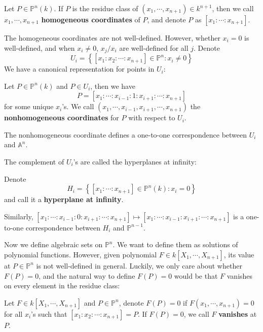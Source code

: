 \documentclass{note-eng}
\begin{document}
\begin{definition}
    Let $P \in \mathbb{P}^n(k)$. If $P$ is the residue class of $(x_1, \cdots, x_{n + 1}) \in k^{n + 1}$, then we call $x_1, \cdots, x_{n + 1}$ \textbf{homogeneous coordinates} of $P$, and denote $P$ as $[x_1 : \cdots : x_{n + 1}]$.
\end{definition}

The homogeneous coordinates are not well-defined. However, whether $x_i = 0$ is well-defined, and when $x_i \ne 0$, $x_j / x_i$ are well-defined for all $j$. Denote
$$U_i = \left\lbrace [x_1:x_2:\cdots:x_{n + 1}] \in \mathbb{P}^n: x_i \ne 0 \right\rbrace$$
We have a canonical representation for points in $U_i$:

\begin{definition}
    Let $P \in \mathbb{P}^n(k)$ and $P \in U_i$, then we have
    $$P = [x_1 : \cdots : x_{i - 1} : 1 : x_{i + 1} : \cdots : x_{n + 1}]$$
    for some unique $x_i$'s. We call $(x_1, \cdots, x_{i - 1}, x_{i + 1}, \cdots, x_{n + 1})$ the \textbf{nonhomogeneous coordinates} for $P$ with respect to $U_i$.
\end{definition}

The nonhomogeneous coordinate defines a one-to-one correspondence between $U_i$ and $\mathbb{A}^n$.

The complement of $U_i$'s are called the hyperplanes at infinity:

\begin{definition}
    Denote
    $$H_{i} = \left\lbrace [x_1 : \cdots : x_{n + 1}] \in \mathbb{P}^n(k): x_{i} = 0 \right\rbrace$$
    and call it a \textbf{hyperplane at infinity}.
\end{definition}

Similarly, $[x_1 : \cdots : x_{i - 1} : 0 : x_{i + 1} : \cdots : x_{n + 1}] \mapsto [x_1 : \cdots : x_{i - 1} : x_{i + 1} : \cdots : x_{n + 1}]$ is a one-to-one correspondence between $H_i$ and $\mathbb{P}^{n - 1}$.

Now we define algebraic sets on $\mathbb{P}^n$. We want to define them as solutions of polynomial functions. However, given polynomial $F \in k[X_1, \cdots, X_{n + 1}]$, its value at $P \in \mathbb{P}^n$ is not well-defined in general. Luckily, we only care about whether $F(P) = 0$, and the natural way to define $F(P) = 0$ would be that $F$ vanishes on every element in the residue class:

\begin{notation}
    Let $F \in k[X_1, \cdots, X_{n + 1}]$ and $P \in \mathbb{P}^n$, denote $F(P) = 0$ if $F(x_1, \cdots, x_{n + 1}) = 0$ for all $x_i$'s such that $[x_1:x_2:\cdots:x_{n + 1}] = P$. If $F(P) = 0$, we call $F$ \textbf{vanishes} at $P$.
\end{notation}
\end{document}
